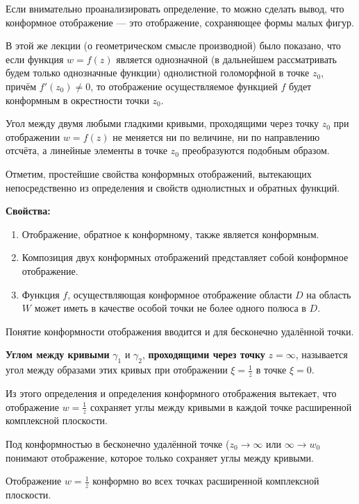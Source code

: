 \documentclass[a4paper, 12pt]{report}
\begin{document}
Если внимательно проанализировать определение, то можно сделать вывод, что конформное отображение --- это отображение, сохраняющее формы малых фигур.

В этой же лекции (о геометрическом смысле производной) было показано, что если функция $w = f(z)$ является однозначной (в дальнейшем рассматривать будем только однозначные функции) однолистной голоморфной в точке $z_0$, причём $f'(z_0) \not= 0$, то отображение осуществляемое функцией $f$ будет конформным в окрестности точки $z_0$.

Угол между двумя любыми гладкими кривыми, проходящими через точку $z_0$ при отображении $w = f(z)$ не меняется ни по величине, ни по направлению отсчёта, а линейные элементы в точке $z_0$ преобразуются подобным образом.

Отметим,  простейшие свойства конформных отображений, вытекающих непосредственно из определения и свойств однолистных и обратных функций.
\par\bigskip

\textbf{Свойства:}
\begin{enumerate}
    \item Отображение, обратное к конформному, также является конформным.
    \item Композиция двух конформных отображений представляет собой конформное отображение.
    \item Функция $f$, осуществляющая конформное отображение области $D$ на область $W$ может иметь в качестве особой точки не более одного полюса в $D$.
\end{enumerate}


Понятие конформности отображения вводится и для бесконечно удалённой точки.
\par\bigskip

\textbf{Углом между кривыми} $\gamma_1$ и $\gamma_2$, \textbf{проходящими через точку} $z = \infty$, называется угол между образами этих кривых при отображении $\xi = \frac{1}{z}$ в точке $\xi = 0$.
\par\bigskip

Из этого определения и определения конформного отображения вытекает, что отображение $w = \frac{1}{z}$ сохраняет углы между кривыми в каждой точке расширенной комплексной плоскости.

Под конформностью в бесконечно удалённой точке ($z_0 \rightarrow \infty$ или $\infty \rightarrow w_0$ понимают отображение, которое только сохраняет углы между кривыми.
\par\bigskip
Отображение $w = \frac{1}{z}$ конформно во всех точках расширенной комплексной плоскости.
\par\bigskip
\end{document}
